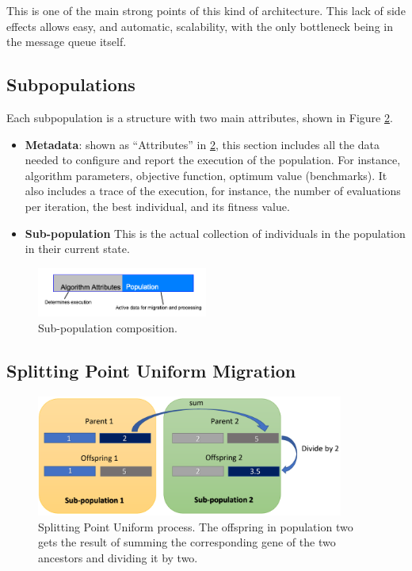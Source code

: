 \documentclass[runningheads]{llncs}
\begin{document}
This is one of the main strong points of this kind of
architecture. This lack of side effects allows easy, and automatic,
scalability, with the only bottleneck being in the message queue
itself.

\subsection{Subpopulations}

Each subpopulation is a structure with two main attributes, shown in
Figure \ref{fig4}.

\begin{itemize}
  \item {\bf Metadata}: shown as ``Attributes'' in \ref{fig4}, this
    section includes all the data needed 
  to configure and report the execution of the population.
  For instance, algorithm parameters, objective function, 
  optimum value (benchmarks). It also includes a trace of the execution, 
  for instance, the number of evaluations per iteration, 
  the best individual, and its fitness value.   
  \item {\bf Sub-population} This is the actual collection of individuals
  in the population in their current state.    
\end{itemize}
%
\begin{figure}[htp]
  \centering
  \includegraphics[width=0.5\textwidth]{img/subpopulationDefinition.png}
  \caption{Sub-population composition.} \label{fig3}
\end{figure}


\subsection{Splitting Point Uniform Migration} 
%
\begin{figure}[htp]
  \centering
  \includegraphics[width=0.9\textwidth]{img/splittinPointUniform.png}
  \caption{Splitting Point Uniform process. The offspring in
    population two gets the result of summing the corresponding gene
    of the two ancestors and dividing it by two.} \label{fig4}

\end{figure}
\end{document}
